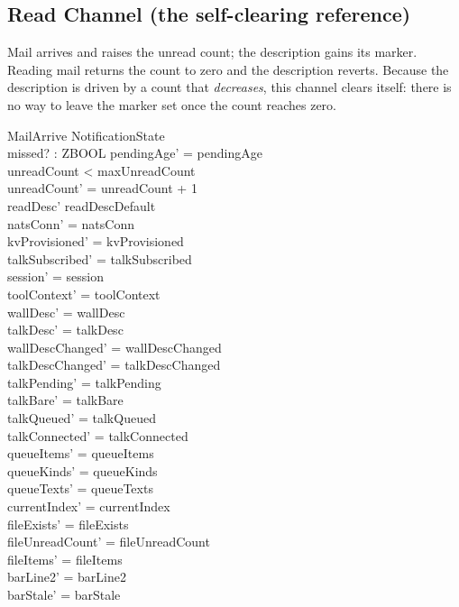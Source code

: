 \documentclass[a4paper,10pt,fleqn]{article}
\begin{document}
\subsection{Read Channel (the self-clearing reference)}

Mail arrives and raises the unread count; the description gains its
marker.  Reading mail returns the count to zero and the description
reverts.  Because the description is driven by a count that
\emph{decreases}, this channel clears itself: there is no way to leave
the marker set once the count reaches zero.

\begin{schema}{MailArrive}
  \Delta NotificationState \\
  missed? : ZBOOL
  \where
  pendingAge' = pendingAge \\
  unreadCount < maxUnreadCount \\
  unreadCount' = unreadCount + 1 \\
  readDesc' \neq readDescDefault \\
  natsConn' = natsConn \\
  kvProvisioned' = kvProvisioned \\
  talkSubscribed' = talkSubscribed \\
  session' = session \\
  toolContext' = toolContext \\
  wallDesc' = wallDesc \\
  talkDesc' = talkDesc \\
  wallDescChanged' = wallDescChanged \\
  talkDescChanged' = talkDescChanged \\
  talkPending' = talkPending \\
  talkBare' = talkBare \\
  talkQueued' = talkQueued \\
  talkConnected' = talkConnected \\
  queueItems' = queueItems \\
  queueKinds' = queueKinds \\
  queueTexts' = queueTexts \\
  currentIndex' = currentIndex \\
  fileExists' = fileExists \\
  fileUnreadCount' = fileUnreadCount \\
  fileItems' = fileItems \\
  barLine2' = barLine2 \\
  barStale' = barStale \\

\end{schema}
\end{document}
